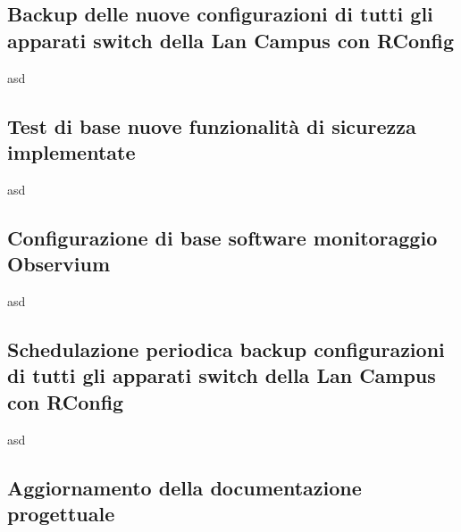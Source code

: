 \documentclass[Realizzazione.tex]{subfiles}
\begin{document}
\subsection{Backup delle nuove configurazioni di tutti gli apparati switch della Lan Campus con RConfig} 
asd
\subsection{Test di base nuove funzionalità di sicurezza implementate} 
asd
\subsection{Configurazione di base software monitoraggio Observium}
asd
\subsection{Schedulazione periodica backup configurazioni di tutti gli apparati switch della Lan Campus con RConfig}
asd
\subsection{Aggiornamento della documentazione progettuale}


	
\end{document}
